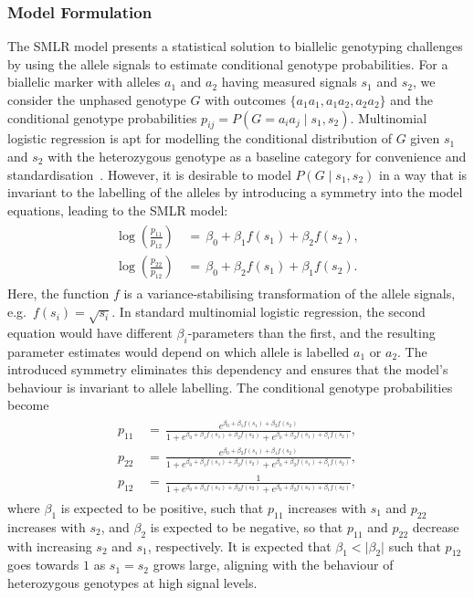 \documentclass[preprint,5p,times,11pt]{elsarticle}
\begin{document}
\subsubsection{Model Formulation}
The SMLR model presents a statistical solution to biallelic genotyping challenges by using the allele signals to estimate conditional genotype probabilities.
For a biallelic marker with alleles $a_1$ and $a_2$ having measured signals $s_1$ and $s_2$, we consider the unphased genotype $G$ with outcomes $\{a_1a_1, a_1a_2, a_2a_2\}$ and the conditional genotype probabilities $p_{ij} = P\left(G = a_i a_j \mid s_1, s_2 \right)$.
Multinomial logistic regression is apt for modelling the conditional distribution of $G$ given $s_1$ and $s_2$ with the heterozygous genotype as a baseline category for convenience and standardisation~\cite[p.~293]{agresti}.
However, it is desirable to model $P(G \mid s_1, s_2)$ in a way that is invariant to the labelling of the alleles by introducing a symmetry into the model equations, leading to the SMLR model:
\begin{align}\label{eq:smlr}
\begin{split}
\log\left(\frac{p_{11}}{p_{12}}\right) \, &= \, \beta_0 + \beta_1 f(s_1) + \beta_2 f(s_2), \\
\log\left(\frac{p_{22}}{p_{12}}\right) \, &= \, \beta_0 + \beta_2 f(s_1) + \beta_1 f(s_2).
\end{split}
\end{align}
Here, the function $f$ is a variance-stabilising transformation of the allele signals, e.g.~$f(s_i) = \sqrt{s_i}$.
In standard multinomial logistic regression, the second equation would have different $\beta_i$-parameters than the first, and the resulting parameter estimates would depend on which allele is labelled $a_1$ or $a_2$.
The introduced symmetry eliminates this dependency and ensures that the model's behaviour is invariant to allele labelling.
The conditional genotype probabilities become
\begin{align}\label{eq:posterior}
\begin{split}
p_{11} \, &= \, \frac{e^{\beta_0 + \beta_1 f(s_1) + \beta_2 f(s_2) }}{1 + e^{\beta_0 + \beta_1 f(s_1) + \beta_2 f(s_2)} + e^{\beta_0 + \beta_2 f(s_1) + \beta_1 f(s_2)}}, \\
p_{22} \, &= \, \frac{e^{\beta_0 + \beta_2 f(s_1) + \beta_1 f(s_2) }}{1 + e^{\beta_0 + \beta_1 f(s_1) + \beta_2 f(s_2)} + e^{\beta_0 + \beta_2 f(s_1) + \beta_1 f(s_2)}}, \\
p_{12} \, &= \, \frac{1}{1 + e^{\beta_0 + \beta_1 f(s_1) + \beta_2 f(s_2)} + e^{\beta_0 + \beta_2 f(s_1) + \beta_1 f(s_2)}},
\end{split}
\end{align}
where $\beta_1$ is expected to be positive, such that $p_{11}$ increases with $s_1$ and $p_{22}$ increases with $s_2$, and $\beta_2$ is expected to be negative, so that $p_{11}$ and $p_{22}$ decrease with increasing $s_2$ and $s_1$, respectively.
It is expected that $\beta_1 < \lvert \beta_2 \rvert$ such that $p_{12}$ goes towards $1$ as $s_1 = s_2$ grows large, aligning with the behaviour of heterozygous genotypes at high signal levels.
\end{document}
